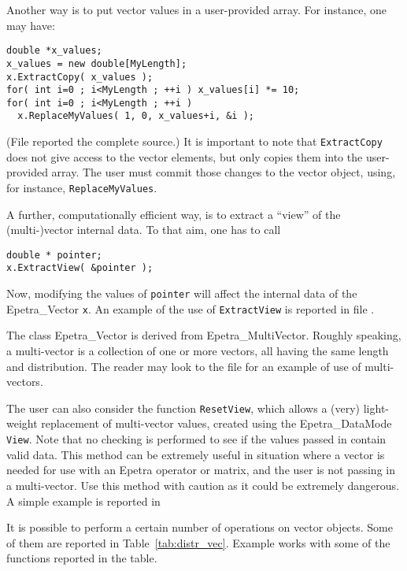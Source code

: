 Another way is to put vector values in a user-provided array. For
instance, one may have:
\begin{verbatim}
double *x_values;
x_values = new double[MyLength];
x.ExtractCopy( x_values );
for( int i=0 ; i<MyLength ; ++i ) x_values[i] *= 10;
for( int i=0 ; i<MyLength ; ++i ) 
  x.ReplaceMyValues( 1, 0, x_values+i, &i );
\end{verbatim}
(File  reported the complete source.)  It
is important to note that \verb!ExtractCopy! does not give access to the
vector elements, but only copies them into the user-provided array.  The
user must commit those changes to the vector object, using, for
instance, \verb!ReplaceMyValues!.

A further, computationally efficient way, is to extract a ``view'' of the
(multi-)vector internal data.  To that aim, one has to call
\begin{verbatim}
double * pointer;
x.ExtractView( &pointer );
\end{verbatim}
Now, modifying the values of \verb!pointer! will affect the internal
data of the Epetra\_Vector \verb!x!.  An example of the use of
\verb!ExtractView! is reported in file .

\begin{remark}
  The class Epetra\_Vector is derived from Epetra\_MultiVector. Roughly
  speaking, a multi-vector is a collection of one or more vectors, all
  having the same length and distribution. The reader may look to the
  file  for an example of use of multi-vectors.
\end{remark}

The user can also consider the function \verb!ResetView!, which allows a
(very) light-weight replacement of multi-vector values, created using
the Epetra\_DataMode \verb!View!. Note that no checking is performed to
see if the values passed in contain valid data. This method can be
extremely useful in situation where a vector is needed for use with an
Epetra operator or matrix, and the user is not passing in a
multi-vector. Use this method with caution as it could be extremely
dangerous.
A simple example is reported in 

\medskip

It is possible to perform a certain number of operations on vector
objects. Some of them are reported in Table~\ref{tab:distr_vec}.
Example  works with some of the functions reported in
the table.

